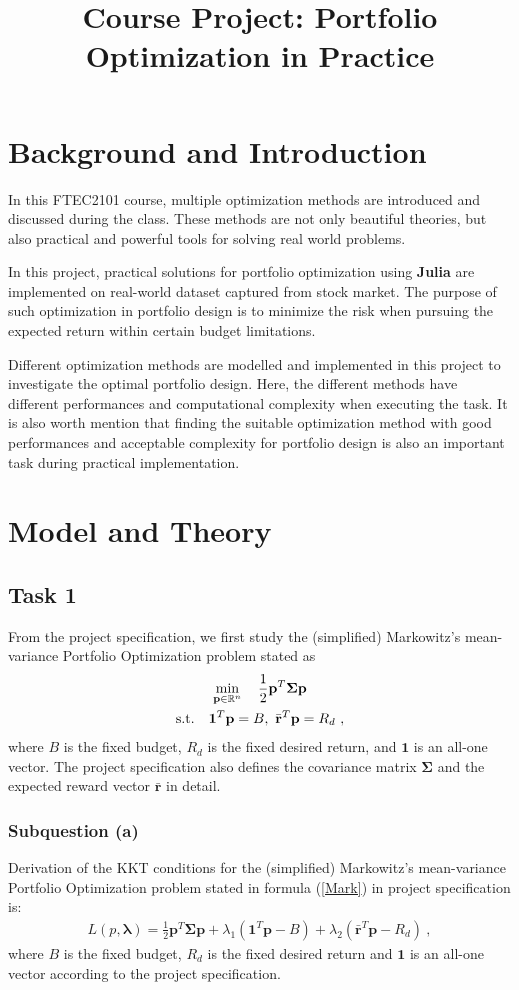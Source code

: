 \documentclass[12pt]{ftec2101}
\title{Course Project: Portfolio Optimization in Practice}
\newcommand{\vect}[1]{\mathbf{#1}}
\begin{document}
\maketitle


\section{Background and Introduction}
In this FTEC2101 course, multiple optimization methods are introduced and discussed during the class. These methods are not only beautiful theories, but also practical and powerful tools for solving real world problems. 


In this project, practical solutions for portfolio optimization using \textbf{Julia} are implemented on real-world dataset captured from stock market. The purpose of such optimization in portfolio design is to minimize the risk when pursuing the expected return within certain budget limitations. 


Different optimization methods are modelled and implemented in this project to investigate the optimal portfolio design. Here, the different methods have different performances and computational complexity when executing the task. It is also worth mention that finding the suitable optimization method with good performances and acceptable complexity for portfolio design is also an important task during practical implementation.

\section{Model and Theory}
\subsection{Task 1}
From the project specification, we first study the (simplified) Markowitz’s mean-variance Portfolio Optimization problem stated as
\begin{gather}
    \min_{\vect{p} \in \mathbb{R}^n} \quad \frac{1}{2}\vect{p}^T \boldsymbol{\Sigma} \vect{p}\\
    \textup{s.t.} \quad \vect{1}^T \vect{p} = B,\ \bar{\vect{r}}^T \vect{p} = R_d\ ,
    \label{Mark}
\end{gather}
where $B$ is the fixed budget, $R_d$ is the fixed desired return, and $\vect{1}$ is an all-one vector. The project specification also defines the covariance matrix $\boldsymbol{\Sigma}$ and the expected reward vector $\bar{\vect{r}}$ in detail.
\subsubsection{Subquestion (a)}
Derivation of the KKT conditions for the (simplified) Markowitz's mean-variance Portfolio Optimization problem stated in formula (\ref{Mark}) in project specification is:
\begin{align}
    L(p,\boldsymbol{\lambda}) = \frac{1}{2}\vect{p}^T\boldsymbol{\Sigma} \vect{p} + \lambda_{1} (\vect{1}^T \vect{p}-B) +\lambda_{2} (\bar{\vect{r}}^T \vect{p}-R_{d})\ ,
\end{align}
where $B$ is the fixed budget, $R_d$ is the fixed desired return and $\vect{1}$ is an all-one vector according to the project specification.
\end{document}
